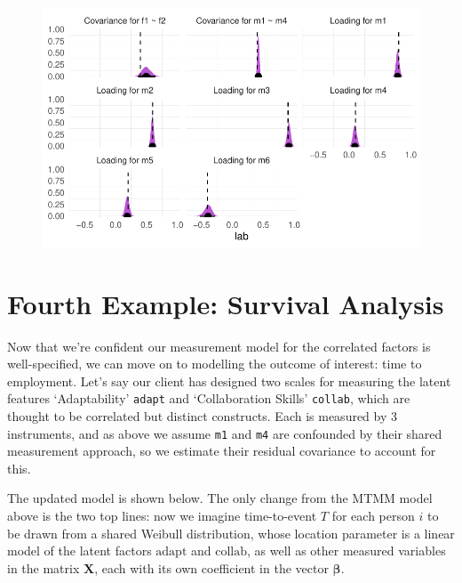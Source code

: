 \documentclass[
  letterpaper,
  DIV=11,
  numbers=noendperiod]{scrreprt}
\begin{document}
\begin{figure}[H]

{\centering \includegraphics{./bayesian-cfa_files/figure-pdf/unnamed-chunk-16-1.pdf}

}

\end{figure}

\hypertarget{fourth-example-survival-analysis}{%
\section{Fourth Example: Survival
Analysis}\label{fourth-example-survival-analysis}}

Now that we're confident our measurement model for the correlated
factors is well-specified, we can move on to modelling the outcome of
interest: time to employment. Let's say our client has designed two
scales for measuring the latent features `Adaptability' \texttt{adapt}
and `Collaboration Skills' \texttt{collab}, which are thought to be
correlated but distinct constructs. Each is measured by 3 instruments,
and as above we assume \texttt{m1} and \texttt{m4} are confounded by
their shared measurement approach, so we estimate their residual
covariance to account for this.

The updated model is shown below. The only change from the MTMM model
above is the two top lines: now we imagine time-to-event \(T\) for each
person \(i\) to be drawn from a shared Weibull distribution, whose
location parameter is a linear model of the latent factors
\(\text{adapt}\) and \(\text{collab}\), as well as other measured
variables in the matrix \(\mathbf{X}\), each with its own coefficient in
the vector \(\boldsymbol{\beta}\).
\end{document}
